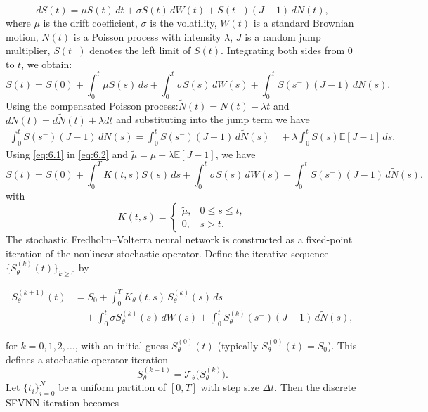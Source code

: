\documentclass[preprint,12pt,authoryear]{elsarticle}
\begin{document}
\begin{equation}
dS(t) = \mu S(t)\,dt + \sigma S(t)\,dW(t) + S(t^-)(J - 1)\,dN(t),\label{eq:6.1}
\end{equation}
where $\mu$ is the drift coefficient, $\sigma$ is the volatility, $W(t)$ is a standard Brownian motion, $N(t)$ is a Poisson process with intensity $\lambda$, $J$ is a random jump multiplier, $S(t^-)$ denotes the left limit of $S(t)$. Integrating both sides from $0$ to $t$, we obtain:
\begin{equation}
S(t) = S(0) + \int_0^t \mu S(s)\,ds + \int_0^t \sigma S(s)\,dW(s) + \int_0^t S(s^-)(J-1)\,dN(s).\label{eq:6.2}
\end{equation}
Using the compensated Poisson process:$\tilde{N}(t) = N(t) - \lambda t$ and $dN(t) = d\tilde{N}(t) + \lambda dt$ and substituting into the jump term we have
\begin{align}
\int_0^t S(s^-)(J-1)\,dN(s)
= \int_0^t S(s^-)(J-1)\,d\tilde{N}(s) 
\quad + \lambda \int_0^t S(s)\mathbb{E}[J-1]\,ds.\label{eq:6.3}
\end{align}
Using \eqref{eq:6.1} in \eqref{eq:6.2} and $\tilde{\mu} = \mu + \lambda \mathbb{E}[J-1]$, we have
\begin{equation}
S(t) = S(0) + \int_0^T K(t,s) S(s)\,ds
+ \int_0^t \sigma S(s)\,dW(s)
+ \int_0^t S(s^-)(J-1)\,d\tilde{N}(s).
\end{equation}
with
\begin{equation}
K(t,s) =
\begin{cases}
\tilde{\mu}, & 0 \le s \le t, \\
0, & s > t.
\end{cases}
\end{equation}
The stochastic Fredholm--Volterra neural network is constructed as a fixed-point iteration of the nonlinear stochastic operator. Define the iterative sequence $\{S_\theta^{(k)}(t)\}_{k\geq 0}$ by

\begin{align}
S_\theta^{(k+1)}(t)
&= S_0
+ \int_0^T K_\theta(t,s)\,S_\theta^{(k)}(s)\,ds \\
&\quad + \int_0^t \sigma S_\theta^{(k)}(s)\,dW(s)
+ \int_0^t S_\theta^{(k)}(s^-)(J-1)\,d\tilde{N}(s),
\end{align}

for $k = 0,1,2,\dots$, with an initial guess $S_\theta^{(0)}(t)$ (typically $S_\theta^{(0)}(t)=S_0$).
This defines a stochastic operator iteration
\begin{equation}
S_\theta^{(k+1)} = \mathcal{T}_\theta\big(S_\theta^{(k)}\big).
\end{equation}
Let $\{t_i\}_{i=0}^N$ be a uniform partition of $[0,T]$ with step size $\Delta t$. Then the discrete SFVNN iteration becomes
\end{document}
